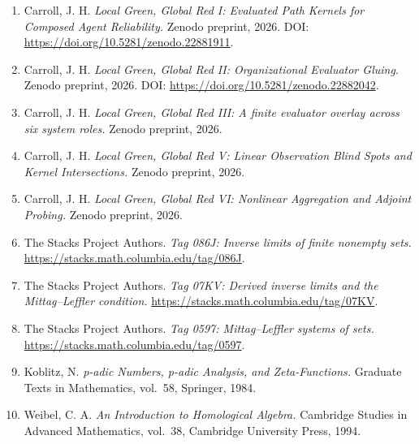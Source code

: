 \documentclass[
  11pt,
]{article}
\providecommand{\tightlist}{%
  \setlength{\itemsep}{0pt}\setlength{\parskip}{0pt}}
\theoremstyle{plain}
\theoremstyle{definition}\newtheorem{definition}[theorem]{Definition}
\theoremstyle{remark}\newtheorem*{remark}{Remark}
\begin{document}
\begin{enumerate}
\def\labelenumi{\arabic{enumi}.}
\tightlist
\item
  Carroll, J. H. \emph{Local Green, Global Red I: Evaluated Path Kernels
  for Composed Agent Reliability.} Zenodo preprint, 2026. DOI:
  \url{https://doi.org/10.5281/zenodo.22881911}.
\item
  Carroll, J. H. \emph{Local Green, Global Red II: Organizational
  Evaluator Gluing.} Zenodo preprint, 2026. DOI:
  \url{https://doi.org/10.5281/zenodo.22882042}.
\item
  Carroll, J. H. \emph{Local Green, Global Red III: A finite evaluator
  overlay across six system roles.} Zenodo preprint, 2026.
\item
  Carroll, J. H. \emph{Local Green, Global Red V: Linear Observation
  Blind Spots and Kernel Intersections.} Zenodo preprint, 2026.
\item
  Carroll, J. H. \emph{Local Green, Global Red VI: Nonlinear Aggregation
  and Adjoint Probing.} Zenodo preprint, 2026.
\item
  The Stacks Project Authors. \emph{Tag 086J: Inverse limits of finite
  nonempty sets.} \url{https://stacks.math.columbia.edu/tag/086J}.
\item
  The Stacks Project Authors. \emph{Tag 07KV: Derived inverse limits and
  the Mittag--Leffler condition.}
  \url{https://stacks.math.columbia.edu/tag/07KV}.
\item
  The Stacks Project Authors. \emph{Tag 0597: Mittag--Leffler systems of
  sets.} \url{https://stacks.math.columbia.edu/tag/0597}.
\item
  Koblitz, N. \emph{p-adic Numbers, p-adic Analysis, and
  Zeta-Functions.} Graduate Texts in Mathematics, vol.~58, Springer,
  1984.
\item
  Weibel, C. A. \emph{An Introduction to Homological Algebra.} Cambridge
  Studies in Advanced Mathematics, vol.~38, Cambridge University Press,
  1994.
\end{enumerate}
\end{document}
